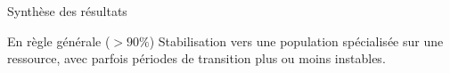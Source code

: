 \documentclass[8pt, handout=show,notes=show]{beamer}
\begin{document}
\begin{frame}{Synthèse des résultats}
\begin{table}[H]
	\end{table}
	
		
	
	\begin{alertblock}{En règle générale ($>90\%$) }
	Stabilisation vers \alert{une} population spécialisée sur \alert{une} ressource, avec parfois périodes de transition plus ou moins instables.
	\end{alertblock}
	
	\end{frame}
\end{document}
